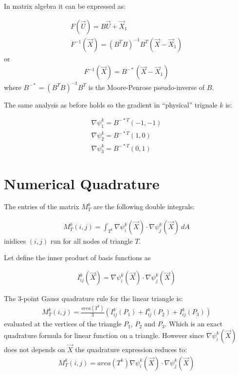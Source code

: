 \documentclass{birkjour}
\numberwithin{equation}{section}
\begin{document}
In matrix algebra it can be expressed as:

\begin{eqnarray}
	F(\vec U) = B \vec U + \vec X_1 \nonumber\\
	F^{-1}(\vec X) = (B^T B)^{-1} B^T (\vec X - \vec X_1)  \nonumber
\end{eqnarray}
or
\begin{eqnarray}
	F^{-1}(\vec X) = B^{-*} (\vec X - \vec X_1) \nonumber
\end{eqnarray}
where $B^{-*} = (B^T B)^{-1} B^T$ is the Moore-Penrose pseudo-inverse of $B$.

The same analysis as before holds so the gradient in ``physical'' trignale $k$ is:

\begin{eqnarray} 
	\nabla \psi^k_1 = B^{-*T} (-1, -1) \nonumber\\
	\nabla \psi^k_2 = B^{-*T} (1, 0) \nonumber\\
	\nabla \psi^k_3 = B^{-*T} (0, 1) \nonumber
\end{eqnarray}
 
\section{Numerical Quadrature}

The entries of the matrix $M_T^k$ are the following double integrals:

\begin{eqnarray} 
	M_T^k(i,j) = \int_{T^k}{ \nabla \psi^k_i(\vec X) \cdot \nabla \psi^k_j(\vec X) \ dA} \nonumber
\end{eqnarray}
inidices $(i,j)$ run for all nodes of triangle $T$.
 
Let define the inner product of basis functions as  

\begin{eqnarray} 
	I^k_{ij}(\vec X) = \nabla \psi^k_i(\vec X) \cdot \nabla \psi^k_j(\vec X) \nonumber
\end{eqnarray}

The 3-point Gauss quadrature rule for the linear triangle is:
\begin{eqnarray} 
	M_T^k(i,j) = \frac{area(T^k)}{3} ( I^k_{ij}(P_1) +  I^k_{ij}(P_2) +  I^k_{ij}(P_3))
\end{eqnarray}
evaluated at the vertices of the triangle $P_1$, $P_2$ and $P_3$. Which is an exact quadrature formula 
for linear function on a triangle. However since $\nabla \psi^k_i(\vec X)$ does not depends on $\vec X$ the quadrature 
expression reduces to:
\begin{eqnarray} 
	M_T^k(i,j) = area(T^k) \nabla \psi^k_i(\vec X) \cdot \nabla \psi^k_j(\vec X) \nonumber
\end{eqnarray}
\end{document}
